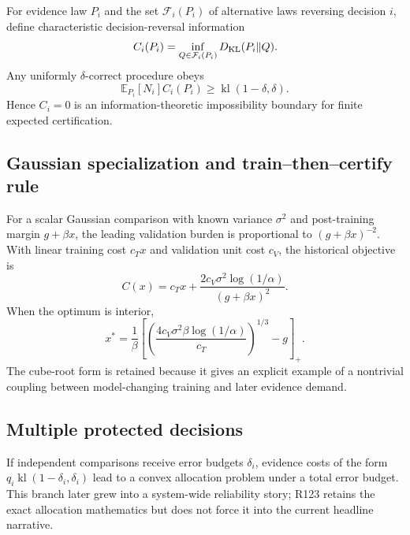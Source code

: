 \documentclass[11pt,letterpaper]{article}
\theoremstyle{plain}
\newcommand{\1}{\mathbf 1}
\begin{document}
For evidence law $P_i$ and the set $\mathcal F_i(P_i)$ of alternative laws reversing decision $i$, define characteristic decision-reversal information
\begin{equation}
 C_i(P_i)=\inf_{Q\in\mathcal F_i(P_i)}D_{\rm KL}(P_i\Vert Q).
\end{equation}
Any uniformly $\delta$-correct procedure obeys
\begin{equation}
 \mathbb E_{P_i}[N_i]C_i(P_i)\ge \operatorname{kl}(1-\delta,\delta).
\end{equation}
Hence $C_i=0$ is an information-theoretic impossibility boundary for finite expected certification.

\subsection{Gaussian specialization and train--then--certify rule}
For a scalar Gaussian comparison with known variance $\sigma^2$ and post-training margin $g+\beta x$, the leading validation burden is proportional to $(g+\beta x)^{-2}$. With linear training cost $c_Tx$ and validation unit cost $c_V$, the historical objective is
\begin{equation}
 C(x)=c_Tx+\frac{2c_V\sigma^2\log(1/\alpha)}{(g+\beta x)^2}.
\end{equation}
When the optimum is interior,
\begin{equation}
 x^*=\frac{1}{\beta}\left[\left(\frac{4c_V\sigma^2\beta\log(1/\alpha)}{c_T}\right)^{1/3}-g\right]_+.
\end{equation}
The cube-root form is retained because it gives an explicit example of a nontrivial coupling between model-changing training and later evidence demand.

\subsection{Multiple protected decisions}
If independent comparisons receive error budgets $\delta_i$, evidence costs of the form $q_i\operatorname{kl}(1-\delta_i,\delta_i)$ lead to a convex allocation problem under a total error budget. This branch later grew into a system-wide reliability story; R123 retains the exact allocation mathematics but does not force it into the current headline narrative.

\clearpage
\end{document}
